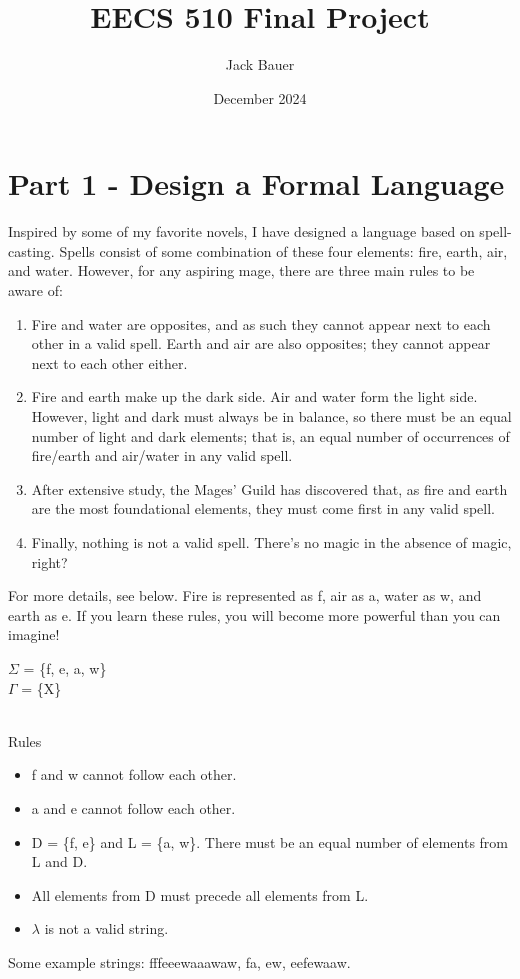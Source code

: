 \documentclass{article}
\title{EECS 510 Final Project}
\author{Jack Bauer}
\date{December 2024}
\begin{document}
\maketitle
\section{Part 1 - Design a Formal Language}
Inspired by some of my favorite novels, I have designed a language based on spell-casting. Spells consist of some combination of these four elements: fire, earth, air, and water. However, for any aspiring mage, there are three main rules to be aware of:
\begin{enumerate}
    \item 
    Fire and water are opposites, and as such they cannot appear next to each other in a valid spell. Earth and air are also opposites; they cannot appear next to each other either. 
    \item 
    Fire and earth make up the dark side. Air and water form the light side. However, light and dark must always be in balance, so there must be an equal number of light and dark elements; that is, an equal number of occurrences of fire/earth and air/water in any valid spell.
    \item 
    After extensive study, the Mages' Guild has discovered that, as fire and earth are the most foundational elements, they must come first in any valid spell.
    \item
    Finally, nothing is not a valid spell. There's no magic in the absence of magic, right? 
\end{enumerate}
For more details, see below. Fire is represented as f, air as a, water as w, and earth as e. If you learn these rules, you will become more powerful than you can imagine!
\begin{center}
    $\Sigma$ = \{f, e, a, w\}\\
    $\Gamma$ = \{X\} \\
    \hfill \\ 
\end{center}
Rules
\begin{itemize}
    \item f and w cannot follow each other.
    \item a and e cannot follow each other.
    \item D = \{f, e\} and L = \{a, w\}. There must be an equal number of elements from L and D. 
    \item All elements from D must precede all elements from L. 
    \item $\lambda$ is not a valid string.
    \end{itemize}
Some example strings: fffeeewaaawaw, fa, ew, eefewaaw.
\end{document}
